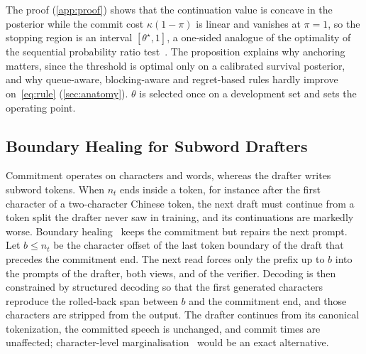 The proof (\cref{app:proof}) shows that the continuation value is concave in the posterior while the commit cost $\kappa(1-\pi)$ is linear and vanishes at $\pi = 1$, so the stopping region is an interval $[\theta^\star, 1]$, a one-sided analogue of the optimality of the sequential probability ratio test~\citep{wald1948optimum}.
The proposition explains why anchoring matters, since the threshold is optimal only on a calibrated survival posterior, and why queue-aware, blocking-aware and regret-based rules hardly improve on~\eqref{eq:rule} (\cref{sec:anatomy}).
$\theta$ is selected once on a development set and sets the operating point.

\subsection{Boundary Healing for Subword Drafters}
\label{sec:heal}

Commitment operates on characters and words, whereas the drafter writes subword tokens.
When $n_t$ ends inside a token, for instance after the first character of a two-character Chinese token, the next draft must continue from a token split the drafter never saw in training, and its continuations are markedly worse.
Boundary healing~\citep{lundberg2023tokenhealing} keeps the commitment but repairs the next prompt.
Let $b \le n_t$ be the character offset of the last token boundary of the draft that precedes the commitment end.
The next read forces only the prefix up to $b$ into the prompts of the drafter, both views, and of the verifier.
Decoding is then constrained by structured decoding so that the first generated characters reproduce the rolled-back span between $b$ and the commitment end, and those characters are stripped from the output.
The drafter continues from its canonical tokenization, the committed speech is unchanged, and commit times are unaffected; character-level marginalisation~\citep{vieira2025characters,phan2025exact} would be an exact alternative.
